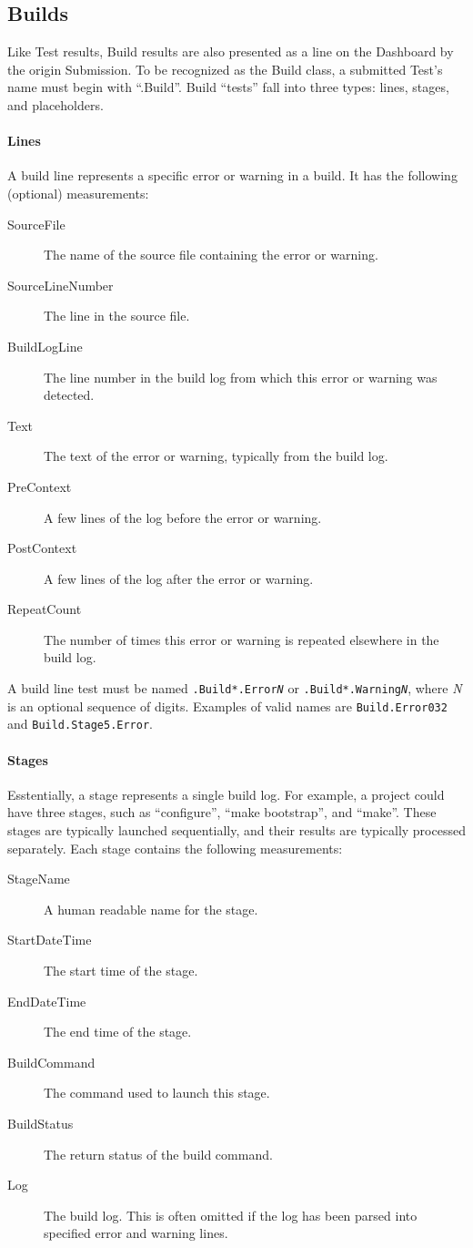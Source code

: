 \documentclass{InsightBook}
\begin{document}
\subsection{Builds}
Like Test results, Build results are also presented as a line on the
Dashboard by the origin Submission. To be recognized as the Build
class, a submitted Test's name must begin with ``.Build''. Build ``tests''
fall into three types: lines, stages, and placeholders.

\paragraph{Lines} A build line represents a specific error or warning in a
build. It has the following (optional) measurements:
\begin{description}
\item[SourceFile] The name of the source file containing the error or warning.
\item[SourceLineNumber] The line in the source file.
\item[BuildLogLine] The line number in the build log from which this
  error or warning was detected.
\item[Text] The text of the error or warning, typically from the build log.
\item[PreContext] A few lines of the log before the error or warning.
\item[PostContext] A few lines of the log after the error or warning.
\item[RepeatCount] The number of times this error or warning is
  repeated elsewhere in the build log.
\end{description}
A build line test must be named \texttt{.Build*.Error\emph{N}} or
\texttt{.Build*.Warning\emph{N}}, where \emph{N} is an optional
sequence of digits. Examples of valid names are
\texttt{Build.Error032} and \texttt{Build.Stage5.Error}.


\paragraph{Stages} Esstentially, a stage represents a single build
log. For example, a project could have three stages, such as
``configure'', ``make bootstrap'', and ``make''. These stages are
typically launched sequentially, and their results are typically
processed separately. Each stage contains the following measurements:
\begin{description}
\item[StageName] A human readable name for the stage.
\item[StartDateTime] The start time of the stage.
\item[EndDateTime] The end time of the stage.
\item[BuildCommand] The command used to launch this stage.
\item[BuildStatus] The return status of the build command.
\item[Log] The build log. This is often omitted if the log has been
  parsed into specified error and warning lines.
\end{description}
\end{document}
